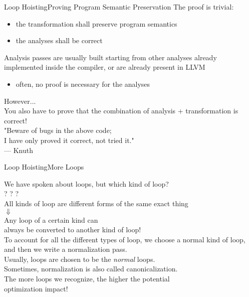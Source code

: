 \begin{frame}{Loop Hoisting}{Proving Program Semantic Preservation}
The \alert{proof} is trivial:

\begin{itemize}
\item the transformation shall preserve program semantics
\item the analyses shall be correct
\end{itemize}

Analysis passes are usually built starting from other analyses already
implemented inside the compiler, or are already present in LLVM
\begin{itemize}
\item often, no proof is necessary for the analyses
\end{itemize}

\vfill
\begin{center}
\alert{However...}\\
\smallskip
You also have to prove that the combination of analysis + transformation is correct!\\
\smallskip
"Beware of bugs in the above code;\\I have only proved it correct, not tried it."\\--- Knuth
\end{center}
\end{frame}


\begin{frame}{Loop Hoisting}{More Loops}
\begin{center} 
We have spoken about loops, but which kind of loop?\\
\medskip
{}? ? ?\\

\bigskip
All kinds of loop are different forms of the \alert{same exact thing}\\
$\Downarrow$\\
Any loop of a certain kind can\\always be converted to another kind of loop!\\

\bigskip
To account for all the different types of loop, we choose a \alert{normal}
kind of loop, and then we write a \alert{normalization}  pass.\\
\smallskip
{\footnotesize
Usually,  loops are chosen to be the \emph{normal} loops.\\
\vspace{-1mm}
Sometimes, normalization is also called \alert{canonicalization}.}\\

\bigskip
The more loops we recognize, the higher the potential\\
\alert{optimization impact}!
\end{center}
\end{frame}



